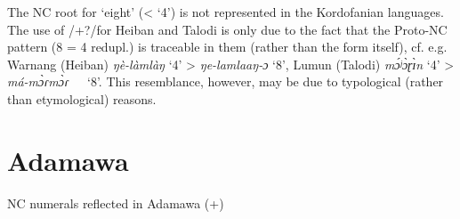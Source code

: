 The NC root for ‘eight’ (< ‘4’) is not represented in the Kordofanian languages. The use of /+?/for Heiban and Talodi is only due to the fact that the Proto-NC pattern (8 = 4 redupl.) is traceable in them (rather than the form itself), cf. e.g. Warnang (Heiban) \textit{ŋè-làmlàŋ} ‘4’ > \textit{ŋe-lamlaaŋ-ɔ} ‘8’, Lumun (Talodi) \textit{m{\'{ɔ}}ʲ{\`{ɔ}}ɽ{\`{ɪ}}n} ‘4’ > \textit{má-m{\`{ɔ}}ɾm{\`{ɔ}}ɾ}~~~‘8’. This resemblance, however, may be due to typological (rather than etymological) reasons. 


\section{Adamawa}%
\largerpage
\begin{table}
\caption{\label{tab:5:6}NC numerals reflected in Adamawa (+)}
\small


\end{table}
